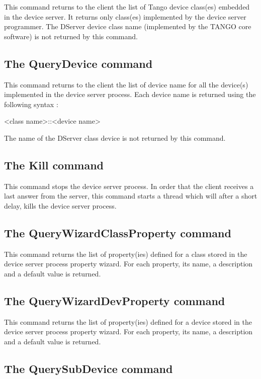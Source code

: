 This command returns to the client the list of Tango device class(es)
embedded in the device server. It returns only class(es) implemented
by the device server programmer. The DServer device class name (implemented
by the TANGO core software) is not returned by this command.


\subsection{The QueryDevice command}

This command returns to the client the list of device name for all
the device(s) implemented in the device server process. Each device
name is returned using the following syntax : \begin{center}<class
name>::<device name>\end{center}

The name of the DServer class device is not returned by this command.


\subsection{The Kill command}

This command stops the device server process. In order that the client
receives a last answer from the server, this command starts a thread
which will after a short delay, kills the device server process.


\subsection{The QueryWizardClassProperty command}

This command returns the list of property(ies) defined for a class
stored in the device server process property wizard. For each property,
its name, a description and a default value is returned.


\subsection{The QueryWizardDevProperty command}

This command returns the list of property(ies) defined for a device
stored in the device server process property wizard. For each property,
its name, a description and a default value is returned.


\subsection{The QuerySubDevice command}

